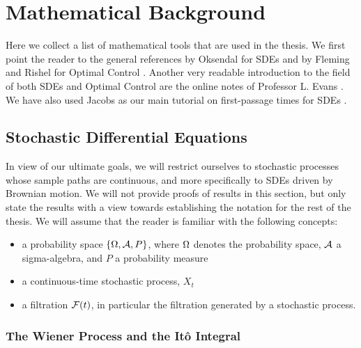 \chapter{Mathematical Background}
\label{ch:math_background}

Here we collect a list of mathematical tools that are used in the thesis. We
first point the reader to the general references by Oksendal for SDEs
\cite{Oksendal2007} and by Fleming and Rishel for Optimal Control
\cite{Fleming1975}. Another very readable introduction to the field of both SDEs
and Optimal Control are the online notes of Professor L. Evans
\cite{Evansa,Evansb}. We have also used Jacobs as our main tutorial on
first-passage times for SDEs \cite{Jacobs}.
 
\section{Stochastic Differential Equations}
\label{sec:SDEs}
In view of our ultimate goals, we will restrict ourselves to  stochastic
processes whose sample paths are continuous, and more specifically to SDEs
driven by Brownian motion. We will not provide proofs of results in this
section, but only state the results with a view towards establishing the
notation for the rest of the thesis. We will assume that the reader is familiar
with the following concepts:
\begin{itemize} 
  \item a probability space $\{{\Omega}, { \mathcal{A} }, P\}$, where ${\Omega}$ denotes the probability space, ${ \mathcal{A} }$ a sigma-algebra, and $P$ a probability measure
  \item a continuous-time stochastic process, $X_t$
  \item a filtration ${\mathcal{F}}(t)$, in particular the filtration generated by a
  stochastic process.
\end{itemize}

\subsection{The Wiener Process and the It\^o Integral}


